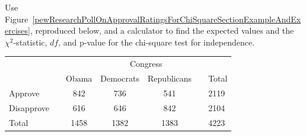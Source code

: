 \begin{exercisewrap}
\begin{nexercise}
Use Figure~\ref{pewResearchPollOnApprovalRatingsForChiSquareSectionExampleAndExercises}, reproduced below, and a calculator to find the expected values and the $\chi^2$-statistic, $df$, and p-value for the chi-square test for independence.\footnotemark

\begin{center}
\begin{tabular}{ll ccc ll}
& & & \multicolumn{2}{c}{Congress} & \\
\cline{4-5}
 & \hspace{1mm} & Obama & Democrats & Republicans & \hspace{1mm} & Total \\
\hline
Approve				   & & 842    & 736 & 541   & 				& 2119 \\
Disapprove			   & & 616    & 646 & 842   &				& 2104 \\
\hline
Total					   & & 1458    & 1382 & 1383 & 				& 4223 \\
\hline
\end{tabular}
\end{center}
\end{nexercise}
\end{exercisewrap}



 

